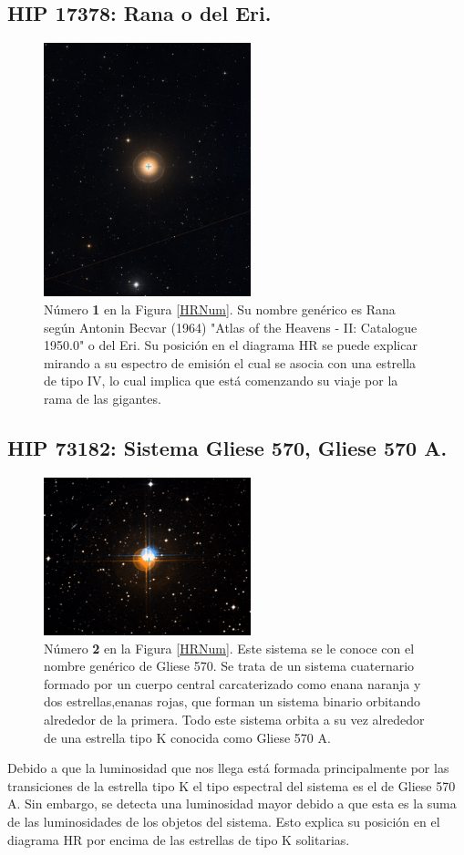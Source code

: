 \documentclass[a4paper]{article}
\begin{document}
		\subsection{HIP 17378: Rana o del Eri.}
		\begin{figure}[H]
			\includegraphics[trim={0 6cm 0 6cm},clip,width=6cm]{Figures/HIP17378.png}
			
			\caption{N\'{u}mero \textbf{1} en la Figura \ref{HRNum}. Su nombre gen\'{e}rico es Rana seg\'{u}n Antonin Becvar (1964) "Atlas of the Heavens - II: Catalogue 1950.0" o del Eri. Su posici\'{o}n en el diagrama HR se puede explicar mirando a su espectro de emisi\'{o}n el cual se asocia con una estrella de tipo IV, lo cual implica que est\'{a} comenzando su viaje por la rama de las gigantes.}
		\end{figure}
		
		
		\subsection{HIP 73182: Sistema Gliese 570, Gliese 570 A.}
				\begin{figure}[H]
			\includegraphics[width=6cm]{Figures/HIP73182.png}
			
			\caption{N\'{u}mero \textbf{2} en la Figura \ref{HRNum}. Este sistema se le conoce con el nombre gen\'{e}rico de Gliese 570. Se trata de un sistema cuaternario formado por un cuerpo central carcaterizado como enana naranja y dos estrellas,enanas rojas, que forman un sistema binario orbitando alrededor de la primera. Todo este sistema orbita a su vez alrededor de una estrella tipo K conocida como Gliese 570 A.}
		\end{figure}
		Debido a que la luminosidad que nos llega est\'{a} formada principalmente por las transiciones de la estrella tipo K el tipo espectral del sistema es el de Gliese 570 A. Sin embargo, se detecta una luminosidad mayor debido a que esta es la suma de las luminosidades de los objetos del sistema. Esto explica su posici\'{o}n en el diagrama HR por encima de las estrellas de tipo K solitarias.
		
\end{document}
